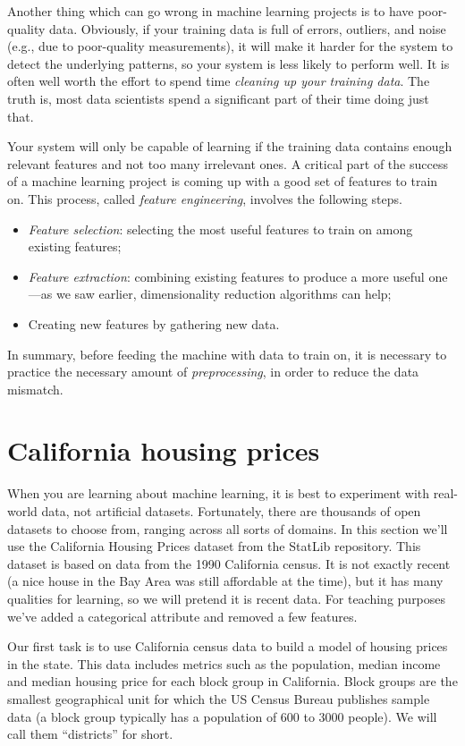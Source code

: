 Another thing which can go wrong in machine learning projects is to have poor-quality data. Obviously, if your training data is full of errors, outliers, and noise (e.g., due to poor-quality measurements), it will make it harder for the system to detect the underlying patterns, so your system is less likely to perform well. It is often well worth the effort to spend time \emph{cleaning up your training data}. The truth is, most data scientists spend a significant part of their time doing just that.

Your system will only be capable of learning if the training data contains enough relevant features and not too many irrelevant ones. A critical part of the success of a machine learning project is coming up with a good set of features to train on. This process, called \emph{feature engineering}, involves the following steps.
\begin{itemize}
\item \emph{Feature selection}: selecting the most useful features to train on among existing features;
\item \emph{Feature extraction}: combining existing features to produce a more useful one—as we saw earlier, dimensionality reduction algorithms can help;
\item Creating new features by gathering new data.
\end{itemize}
In summary, before feeding the machine with data to train on, it is necessary to practice the necessary amount of \emph{preprocessing}, in order to reduce the data mismatch.
\section{California housing prices}\label{sec:Californiahousingprices}
When you are learning about machine learning, it is best to experiment with real-world data, not artificial datasets. Fortunately, there are thousands of open datasets to choose from, ranging across all sorts of domains. In this section we'll use the California Housing Prices dataset from the StatLib repository. This dataset is based on data from the 1990 California census. It is not exactly recent (a nice house in the Bay Area was still affordable at the time), but it has many qualities for learning, so we will pretend it is recent data. For teaching purposes we've added a categorical attribute and removed a few features.

Our first task is to use California census data to build a model of housing prices in the state. This data includes metrics such as the population, median income and median housing price for each block group in California. Block groups are the smallest geographical unit for which the US Census Bureau publishes sample data (a block group typically has a population of \num{600} to \num{3000} people). We will call them ``districts'' for short.
